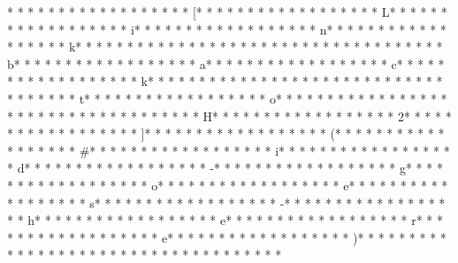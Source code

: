 * * *  * * *  * * *  *  * * *  *  * * *  * [* * *  * * *  * * *  *  * * *  *  * * *  * L* * *  * * *  * * *  *  * * *  *  * * *  * i* * *  * * *  * * *  *  * * *  *  * * *  * n* * *  * * *  * * *  *  * * *  *  * * *  * k* * *  * * *  * * *  *  * * *  *  * * *  *  * * *  * * *  * * *  *  * * *  *  * * *  * b* * *  * * *  * * *  *  * * *  *  * * *  * a* * *  * * *  * * *  *  * * *  *  * * *  * c* * *  * * *  * * *  *  * * *  *  * * *  * k* * *  * * *  * * *  *  * * *  *  * * *  *  * * *  * * *  * * *  *  * * *  *  * * *  * t* * *  * * *  * * *  *  * * *  *  * * *  * o* * *  * * *  * * *  *  * * *  *  * * *  *  * * *  * * *  * * *  *  * * *  *  * * *  * H* * *  * * *  * * *  *  * * *  *  * * *  * 2* * *  * * *  * * *  *  * * *  *  * * *  * ]* * *  * * *  * * *  *  * * *  *  * * *  * (* * *  * * *  * * *  *  * * *  *  * * *  * #* * *  * * *  * * *  *  * * *  *  * * *  * i* * *  * * *  * * *  *  * * *  *  * * *  * d* * *  * * *  * * *  *  * * *  *  * * *  * -* * *  * * *  * * *  *  * * *  *  * * *  * g* * *  * * *  * * *  *  * * *  *  * * *  * o* * *  * * *  * * *  *  * * *  *  * * *  * e* * *  * * *  * * *  *  * * *  *  * * *  * s* * *  * * *  * * *  *  * * *  *  * * *  * -* * *  * * *  * * *  *  * * *  *  * * *  * h* * *  * * *  * * *  *  * * *  *  * * *  * e* * *  * * *  * * *  *  * * *  *  * * *  * r* * *  * * *  * * *  *  * * *  *  * * *  * e* * *  * * *  * * *  *  * * *  *  * * *  * )* * *  * * *  * * *  *  * * *  *  * * *  * 
* * *  * * *  * * *  *  * * *  *  * * *  * 
